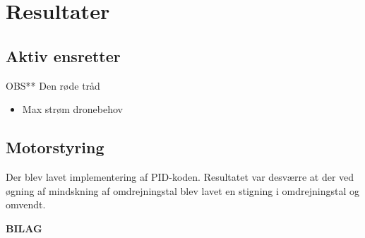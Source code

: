 

\clearpage
\section{Resultater}
\label{sec:resultater}

\subsection{Aktiv ensretter}
\label{sec:aktiv-ensretter}

 OBS** Den røde tråd
 \begin{itemize}
 \item Max strøm dronebehov
 \end{itemize}


\subsection{Motorstyring}
\label{sec:motorstyring-2} 

Der blev lavet implementering af PID-koden. Resultatet var desværre at der ved øgning af mindskning af omdrejningstal blev lavet en stigning i omdrejningstal og omvendt.


% 

\clearpage
\appendix
{}
\vspace*{\fill}
\begin{center}
\Huge{  \textbf{BILAG}}
\end{center}
\vspace*{\fill}


\label{sec:timebox-1}

\clearpage

